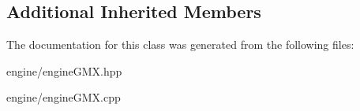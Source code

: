 \subsection*{Additional Inherited Members}


The documentation for this class was generated from the following files\+:\begin{DoxyCompactItemize}
\item 
engine/engine\+G\+M\+X.\+hpp\item 
engine/engine\+G\+M\+X.\+cpp\end{DoxyCompactItemize}
